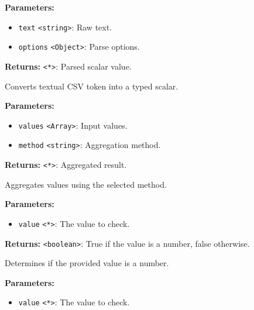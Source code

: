 \documentclass[12pt,a4paper]{article}
\begin{document}
\noindent \textbf{Parameters:}
\begin{itemize}
  \item \texttt{text} \texttt{<string>}: Raw text.
  \item \texttt{options} \texttt{<Object>}: Parse options.
\end{itemize}

\noindent \textbf{Returns:} \texttt{<*>}: Parsed scalar value.

\noindent Converts textual CSV token into a typed scalar.

\vspace{5mm}
\noindent {}


\noindent \textbf{Parameters:}
\begin{itemize}
  \item \texttt{values} \texttt{<Array>}: Input values.
  \item \texttt{method} \texttt{<string>}: Aggregation method.
\end{itemize}

\noindent \textbf{Returns:} \texttt{<*>}: Aggregated result.

\noindent Aggregates values using the selected method.

\vspace{5mm}
\noindent {}


\noindent \textbf{Parameters:}
\begin{itemize}
  \item \texttt{value} \texttt{<*>}: The value to check.
\end{itemize}

\noindent \textbf{Returns:} \texttt{<boolean>}: True if the value is a number, false otherwise.

\noindent Determines if the provided value is a number.

\vspace{5mm}
\noindent {}


\noindent \textbf{Parameters:}
\begin{itemize}
  \item \texttt{value} \texttt{<*>}: The value to check.
\end{itemize}
\end{document}
